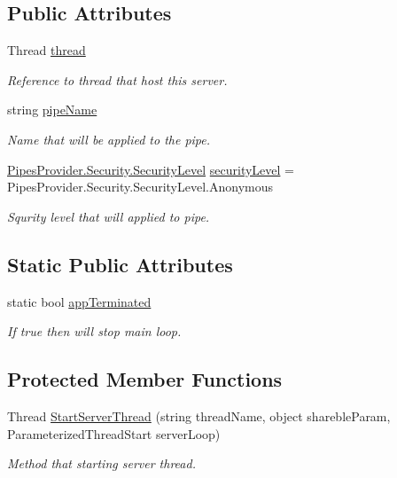 \subsection*{Public Attributes}
\begin{DoxyCompactItemize}
\item 
Thread \mbox{\hyperlink{class_uniform_server_1_1_base_server_a52485a2d70e615a5cbf720c952a8d62f}{thread}}
\begin{DoxyCompactList}\small\item\em Reference to thread that host this server. \end{DoxyCompactList}\item 
string \mbox{\hyperlink{class_uniform_server_1_1_base_server_aaa318b3ed503dd8ccf381c9f3a81ecf2}{pipe\+Name}}
\begin{DoxyCompactList}\small\item\em Name that will be applied to the pipe. \end{DoxyCompactList}\item 
\mbox{\hyperlink{namespace_pipes_provider_1_1_security_a1a6020eca1c661a6f7140e8260502d7e}{Pipes\+Provider.\+Security.\+Security\+Level}} \mbox{\hyperlink{class_uniform_server_1_1_base_server_ac6297faa957fd1005fc61054bdd1cdb1}{security\+Level}} = Pipes\+Provider.\+Security.\+Security\+Level.\+Anonymous
\begin{DoxyCompactList}\small\item\em Squrity level that will applied to pipe. \end{DoxyCompactList}\end{DoxyCompactItemize}
\subsection*{Static Public Attributes}
\begin{DoxyCompactItemize}
\item 
static bool \mbox{\hyperlink{class_uniform_server_1_1_base_server_a632ed557976f4d7bd9b41502bb9a262b}{app\+Terminated}}
\begin{DoxyCompactList}\small\item\em If true then will stop main loop. \end{DoxyCompactList}\end{DoxyCompactItemize}
\subsection*{Protected Member Functions}
\begin{DoxyCompactItemize}
\item 
Thread \mbox{\hyperlink{class_uniform_server_1_1_base_server_aa4a1412b217944e7f8d6ccae6ac68289}{Start\+Server\+Thread}} (string thread\+Name, object shareble\+Param, Parameterized\+Thread\+Start server\+Loop)
\begin{DoxyCompactList}\small\item\em Method that starting server thread. \end{DoxyCompactList}\end{DoxyCompactItemize}
